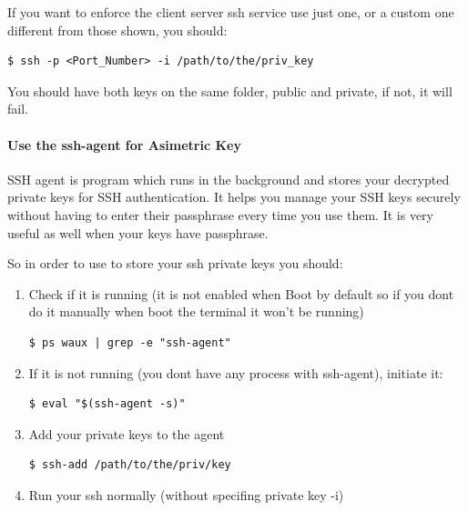 \documentclass{article}
\newenvironment{blocktemplate}[1]{%
    \tcolorbox[beamer,%
    noparskip,breakable,
    colframe=Blue,%
    colbacklower=LimeGreen!75!LightGreen,%
    title=#1]}%
    {\endtcolorbox}
\newenvironment{codetemplate}[1][]{%
  \mybasecolorbox[#1]
  \itshape
}{%
  \endmybasecolorbox
}
\begin{document}
If you want to enforce the client server ssh service use just one, or a custom one different from those shown, you should:
\begin{codetemplate}{}
\begin{verbatim}
$ ssh -p <Port_Number> -i /path/to/the/priv_key
\end{verbatim}
\end{codetemplate}

\begin{blocktemplate}{NOTE}
You should have both keys on the same folder, public and private, if not, it will fail.
\end{blocktemplate}

\paragraph{Use the ssh-agent for Asimetric Key}

SSH agent is program which runs in the background and stores your decrypted private keys for SSH authentication. It helps you manage your SSH keys securely without having to enter their passphrase every time you use them. It is very useful as well when your keys have passphrase.

So in order to use to store your ssh private keys you should:

\begin{enumerate}
    \item Check if it is running (it is not enabled when Boot by default so if you dont do it manually when boot the terminal it won't be running)
\begin{codetemplate}{}
\begin{verbatim}
$ ps waux | grep -e "ssh-agent"
\end{verbatim}
\end{codetemplate}

    \item If it is not running (you dont have any process with ssh-agent), initiate it:
\begin{codetemplate}{}
\begin{verbatim}
$ eval "$(ssh-agent -s)"
\end{verbatim}
\end{codetemplate}

    \item Add your private keys to the agent
\begin{codetemplate}{}
\begin{verbatim}
$ ssh-add /path/to/the/priv/key
\end{verbatim}
\end{codetemplate}

    \item Run your ssh normally (without specifing private key -i)
\end{enumerate}
\end{document}
